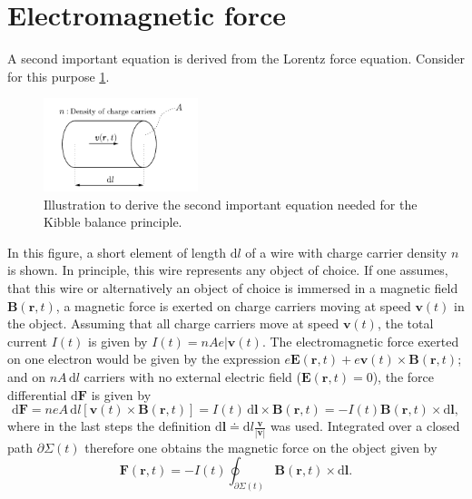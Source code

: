 \documentclass{report}
\numberwithin{tm}{section}
\newcommand\vect[1]{\ensuremath{\bm{#1}}}
\begin{document}
	\section{Electromagnetic force}
	A second important equation is derived from the Lorentz force equation. Consider for this purpose \cref{fig:lorentzforceeq}. \begin{figure}[h]
	\centering
	\includegraphics[width=0.4\textwidth]{figures/lorentzforceeq.pdf}
	\caption{Illustration to derive the second important equation needed for the Kibble balance principle.}
	\label{fig:lorentzforceeq}
	\end{figure}
	In this figure, a short element of length $\mathrm{d}l$ of a wire with charge carrier density $n$ is shown. In principle, this wire represents any object of choice. If one assumes, that this wire or alternatively an object of choice is immersed in a magnetic field $\vect{B}(\vect{r},t)$, a magnetic force is exerted on charge carriers moving at speed $\vect{v}(t)$ in the object. Assuming that all charge carriers move at speed $\vect{v}(t)$, the total current $I(t)$ is given by $I(t) = nAe|\vect{v}(t)$. The electromagnetic force exerted on one electron would be given by the expression $e\vect{E}(\vect{r},t) + e\vect{v}(t) \times \vect{B}(\vect{r},t)$; and on $nA\,\mathrm{d}l$ carriers with no external electric field ($\vect{E}(\vect{r},t) = 0$), the force differential $\mathrm{d}\vect{F}$ is given by \begin{equation}
		\mathrm{d}\vect{F} = neA\,\mathrm{d}l \left[\vect{v}(t)\times \vect{B}(\vect{r},t)\right] = I(t)\,\mathrm{d}\vect{l}\times \vect{B}(\vect{r},t) = -I(t)\vect{B}(\vect{r},t)\times \mathrm{d}\vect{l},
	\end{equation} where in the last steps the definition $\mathrm{d}\vect{l} \doteq \mathrm{d}l\frac{\vect{v}}{|\vect{v}|}$ was used. Integrated over a closed path $\partial \Sigma(t)$ therefore one obtains the magnetic force on the object given by \begin{equation}\label{eq:watt_bal_fund_eq_2}
	\vect{F}(\vect{r},t) = -I(t)\oint_{\partial \Sigma(t)} \vect{B}(\vect{r},t)\times \mathrm{d}\vect{l}.
	\end{equation}
	
\end{document}
